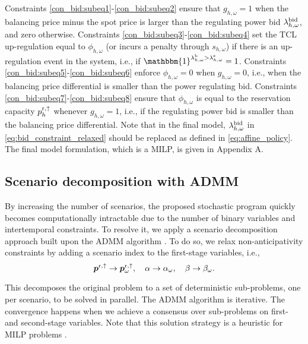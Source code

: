 Constraints \eqref{con_bid:subeq1}-\eqref{con_bid:subeq2} ensure that $g_{h,\omega} = 1$ when the balancing price minus the spot price is larger than the regulating power bid $\lambda^{\rm{bid}}_{h, \omega}$, and zero otherwise. Constraints \eqref{con_bid:subeq3}-\eqref{con_bid:subeq4} set the TCL up-regulation equal to $\phi_{h,\omega}$ (or incurs a penalty through $s_{h,\omega}$) if there is an up-regulation event in the system, i.e., if $\mathbbm{1}^{\lambda^{\rm{b}}_{h,\omega} > \lambda^{\rm{s}}_{h,\omega}} = 1$. Constraints \eqref{con_bid:subeq5}-\eqref{con_bid:subeq6} enforce  $\phi_{h,\omega} = 0$ when $g_{h,\omega} = 0$, i.e., when the balancing price differential is smaller than the power regulating bid. Constraints \eqref{con_bid:subeq7}-\eqref{con_bid:subeq8} ensure that $\phi_{h,\omega}$ is equal to the reservation capacity $p^{\rm{r},\uparrow}_{h}$ whenever $g_{h,\omega} = 1$, i.e., if the regulating power bid is smaller than the balancing price differential. Note that in the final model,  $\lambda^{\rm{bid}}_{h, \omega}$ in \eqref{eq:bid_constraint_relaxed} should be replaced as defined in \eqref{eq:affine_policy}. The final model formulation, which is a MILP, is given in Appendix A.

\vspace{-1mm}
\subsection{Scenario decomposition with ADMM}
By increasing the number of scenarios,  the proposed stochastic program  quickly becomes computationally intractable due to the number of binary variables and intertemporal constraints. To resolve it, we apply a scenario decomposition approach built upon the ADMM algorithm \cite{boyd2011distributed}. To do so, we relax non-anticipativity constraints by adding a scenario index to the first-stage variables, i.e., 
%
\begin{equation}\label{eq:non_anticipativity}
    \bm{p}^{\rm{r},\uparrow} \rightarrow \bm{p}^{\rm{r},\uparrow}_{\omega}, \quad \alpha \rightarrow \alpha_{\omega}, \quad \beta \rightarrow \beta_{\omega}.
\end{equation}

This decomposes the original problem to a set of deterministic sub-problems, one per scenario, to be solved in parallel.  
The ADMM algorithm is iterative. The convergence happens when we achieve a consensus over sub-problems on first- and second-stage  variables. Note that this solution strategy is a heuristic for MILP problems \cite{hong2016convergence}.
